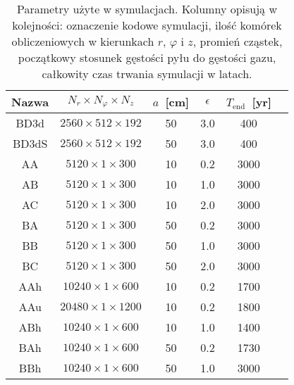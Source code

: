 \begin{table}
   \centering
   \begin{tabular}{cccccc}
      \hline
      Nazwa & $N_r \times N_\varphi \times N_z$ &
      $a$~[cm] & $\epsilon$ & $T_\textrm{end}$~[yr] \\
      \hline
      BD3d  &  $2560  \times 512 \times 192$  & 50  & 3.0 & 400  \\
      BD3dS &  $2560  \times 512 \times 192$  & 50  & 3.0 & 400  \\
      AA    &  $5120  \times 1   \times 300$  & 10  & 0.2 & 3000 \\
      AB    &  $5120  \times 1   \times 300$  & 10  & 1.0 & 3000 \\
      AC    &  $5120  \times 1   \times 300$  & 10  & 2.0 & 3000 \\
      BA    &  $5120  \times 1   \times 300$  & 50  & 0.2 & 3000 \\
      BB    &  $5120  \times 1   \times 300$  & 50  & 1.0 & 3000 \\
      BC    &  $5120  \times 1   \times 300$  & 50  & 2.0 & 3000 \\
      AAh   &  $10240 \times 1   \times 600$  & 10  & 0.2 & 1700 \\
      AAu   &  $20480 \times 1   \times 1200$ & 10  & 0.2 & 1800 \\
      ABh   &  $10240 \times 1   \times 600$  & 10  & 1.0 & 1400 \\
      BAh   &  $10240 \times 1   \times 600$  & 50  & 0.2 & 1730 \\
      BBh   &  $10240 \times 1   \times 600$  & 50  & 1.0 & 3000 \\
      \hline
   \end{tabular}
\caption{Parametry użyte w symulacjach. Kolumny opisują w kolejności: oznaczenie
   kodowe symulacji, ilość komórek obliczeniowych w kierunkach $r$, $\varphi$ i
   $z$, promień cząstek, początkowy stosunek gęstości pyłu do gęstości gazu,
całkowity czas trwania symulacji w latach.}
\label{tab1}
\end{table}

